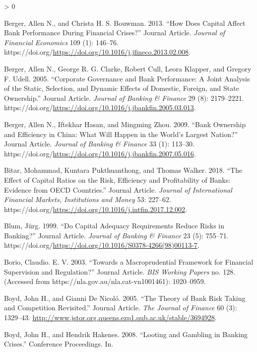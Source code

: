 \documentclass{article}
\newlength{\cslhangindent}
\newenvironment{CSLReferences}[2] %
 {%
  \setlength{\parindent}{0pt}
  \ifodd #1 \everypar{\setlength{\hangindent}{\cslhangindent}}\ignorespaces\fi
  \ifnum #2 > 0
  \setlength{\parskip}{#2\baselineskip}
  \fi
 }%
 {}
\begin{document}
\begin{CSLReferences}{1}{0}
\leavevmode\hypertarget{ref-RN24}{}%
Berger, Allen N., and Christa H. S. Bouwman. 2013. {``How Does Capital
Affect Bank Performance During Financial Crises?''} Journal Article.
\emph{Journal of Financial Economics} 109 (1): 146--76.
https://doi.org/\url{https://doi.org/10.1016/j.jfineco.2013.02.008}.

\leavevmode\hypertarget{ref-RN25}{}%
Berger, Allen N., George R. G. Clarke, Robert Cull, Leora Klapper, and
Gregory F. Udell. 2005. {``Corporate Governance and Bank Performance: A
Joint Analysis of the Static, Selection, and Dynamic Effects of
Domestic, Foreign, and State Ownership.''} Journal Article.
\emph{Journal of Banking \& Finance} 29 (8): 2179--2221.
https://doi.org/\url{https://doi.org/10.1016/j.jbankfin.2005.03.013}.

\leavevmode\hypertarget{ref-RN26}{}%
Berger, Allen N., Iftekhar Hasan, and Mingming Zhou. 2009. {``Bank
Ownership and Efficiency in China: What Will Happen in the World's
Largest Nation?''} Journal Article. \emph{Journal of Banking \& Finance}
33 (1): 113--30.
https://doi.org/\url{https://doi.org/10.1016/j.jbankfin.2007.05.016}.

\leavevmode\hypertarget{ref-RN28}{}%
Bitar, Mohammad, Kuntara Pukthuanthong, and Thomas Walker. 2018. {``The
Effect of Capital Ratios on the Risk, Efficiency and Profitability of
Banks: Evidence from OECD Countries.''} Journal Article. \emph{Journal
of International Financial Markets, Institutions and Money} 53: 227--62.
https://doi.org/\url{https://doi.org/10.1016/j.intfin.2017.12.002}.

\leavevmode\hypertarget{ref-RN29}{}%
Blum, Jürg. 1999. {``Do Capital Adequacy Requirements Reduce Risks in
Banking?''} Journal Article. \emph{Journal of Banking \& Finance} 23
(5): 755--71.
https://doi.org/\url{https://doi.org/10.1016/S0378-4266(98)00113-7}.

\leavevmode\hypertarget{ref-RN30}{}%
Borio, Claudio. E. V. 2003. {``Towards a Macroprudential Framework for
Financial Supervision and Regulation?''} Journal Article. \emph{BIS
Working Papers} no. 128. (Accessed from
https://nla.gov.au/nla.cat-vn1001461): 1020--0959.

\leavevmode\hypertarget{ref-RN32}{}%
Boyd, John H., and Gianni De Nicoló. 2005. {``The Theory of Bank Risk
Taking and Competition Revisited.''} Journal Article. \emph{The Journal
of Finance} 60 (3): 1329--43.
\url{http://www.jstor.org.queens.ezp1.qub.ac.uk/stable/3694928}.

\leavevmode\hypertarget{ref-RN31}{}%
Boyd, John H., and Hendrik Hakenes. 2008. {``Looting and Gambling in
Banking Crises.''} Conference Proceedings. In.


\end{CSLReferences}
\end{document}
